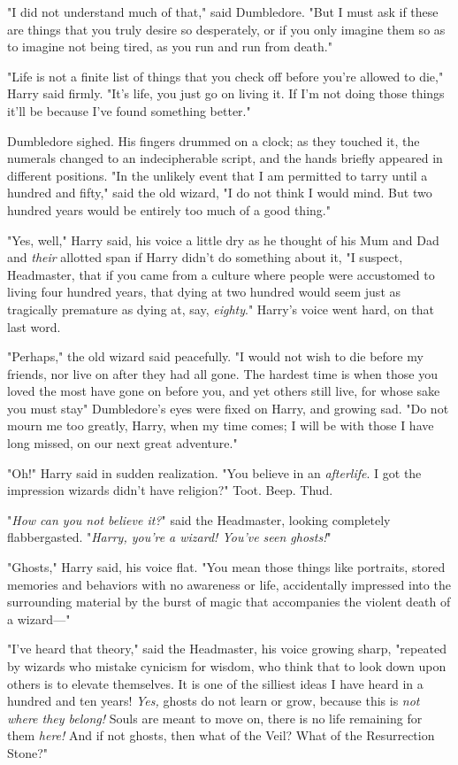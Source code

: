 "I did not understand much of that," said Dumbledore. "But I must ask if these
are things that you truly desire so desperately, or if you only imagine them so
as to imagine not being tired, as you run and run from death."

"Life is not a finite list of things that you check off before you're allowed
to die," Harry said firmly. "It's life, you just go on living it. If I'm not
doing those things it'll be because I've found something better."

Dumbledore sighed. His fingers drummed on a clock; as they touched it, the
numerals changed to an indecipherable script, and the hands briefly appeared in
different positions. "In the unlikely event that I am permitted to tarry until
a hundred and fifty," said the old wizard, "I do not think I would mind. But
two hundred years would be entirely too much of a good thing."

"Yes, well," Harry said, his voice a little dry as he thought of his Mum and
Dad and \emph{their} allotted span if Harry didn't do something about it, "I
suspect, Headmaster, that if you came from a culture where people were
accustomed to living four hundred years, that dying at two hundred would seem
just as tragically premature as dying at, say, \emph{eighty}." Harry's voice
went hard, on that last word.

"Perhaps," the old wizard said peacefully. "I would not wish to die before my
friends, nor live on after they had all gone. The hardest time is when those
you loved the most have gone on before you, and yet others still live, for
whose sake you must stay{\el}" Dumbledore's eyes were fixed on Harry, and
growing sad. "Do not mourn me too greatly, Harry, when my time comes; I will be
with those I have long missed, on our next great adventure."

"Oh!" Harry said in sudden realization. "You believe in an \emph{afterlife}. I
got the impression wizards didn't have religion?"
\sbreak
Toot. Beep. Thud.

"\emph{How can you not believe it?}" said the Headmaster, looking completely
flabbergasted. "\emph{Harry, you're a wizard! You've seen ghosts!}"

"Ghosts," Harry said, his voice flat. "You mean those things like portraits,
stored memories and behaviors with no awareness or life, accidentally impressed
into the surrounding material by the burst of magic that accompanies the
violent death of a wizard—"

"I've heard that theory," said the Headmaster, his voice growing sharp,
"repeated by wizards who mistake cynicism for wisdom, who think that to look
down upon others is to elevate themselves. It is one of the silliest ideas I
have heard in a hundred and ten years! \emph{Yes,} ghosts do not learn or grow,
because this is \emph{not where they belong!} Souls are meant to move on, there
is no life remaining for them \emph{here!} And if not ghosts, then what of the
Veil? What of the Resurrection Stone?"

